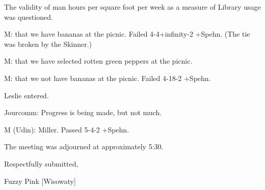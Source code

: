 \documentclass[12pt]{article}
\begin{document}
The validity of man hours per square foot per week as a measure of Library usage was questioned.

M: that we have bananas at the picnic. Failed 4-4+infinity-2 +Spehn. (The tie was broken by the Skinner.)

M: that we have selected rotten green peppers at the picnic.

M: that we not have bananas at the picnic. Failed 4-18-2 +Spehn.

Leslie entered.

Jourcomm: Progress is being made, but not much.

M (Udin): Miller. Passed 5-4-2 +Spehn.

The meeting was adjourned at approximately 5:30.

\vspace{12pt}

\centerline{Respectfully submitted,}
\centerline{Fuzzy Pink [Wisowaty]}
\end{document}
